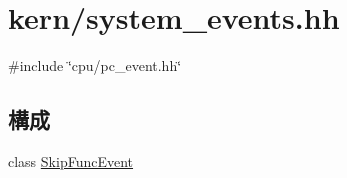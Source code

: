 \hypertarget{system__events_8hh}{
\section{kern/system\_\-events.hh}
\label{system__events_8hh}
}
{\ttfamily \#include \char`\"{}cpu/pc\_\-event.hh\char`\"{}}\par
\subsection*{構成}
\begin{DoxyCompactItemize}
\item 
class \hyperlink{classSkipFuncEvent}{SkipFuncEvent}
\end{DoxyCompactItemize}
